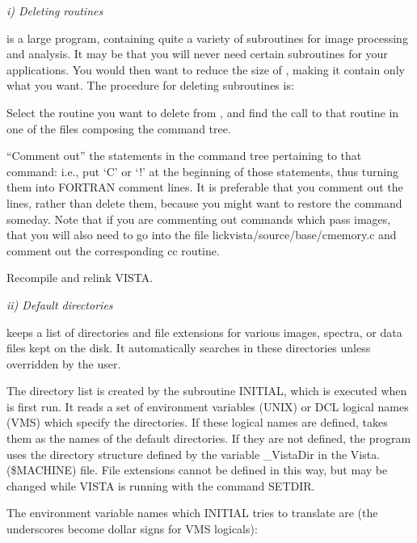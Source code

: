 \Sskip
\centerline {\it i) Deleting routines\rm}

	\V is a large program, containing quite a variety of
subroutines for image processing and analysis.  It may be that
you will never need certain subroutines for your applications.
You would then want to reduce the size of \Vns, making it contain
only what you want.  The procedure for deleting subroutines is:

\hang
{}Select the routine you want to delete
from \Vns, and find the call to that routine in one of the files
composing the command tree. 

\hang
{}``Comment out'' the statements in
the command tree pertaining to that command:  i.e., put `C' or
`!' at the beginning of those statements, thus turning them into
FORTRAN comment lines.  It is preferable that you comment out the
lines, rather than delete them, because you might want to restore
the command someday. Note that if you are commenting out commands which
pass images, that you will also need to go into the file 
lickvista/source/base/cmemory.c and comment out the corresponding cc
routine.

\hang
{}Recompile and relink VISTA.

\Sskip
\centerline {\it ii) Default directories\rm}

	\V keeps a list of directories and file extensions for various
images, spectra, or data files kept on the disk.  It automatically
searches in these directories unless overridden by the user. 

	The directory list is created by the subroutine INITIAL, which
is executed when \V is first run.  It reads a set of environment
variables (UNIX) or DCL logical names (VMS)
which specify the directories.  If these logical names are defined, \V
takes them as the names of the default directories.  If they are not
defined, the program uses the directory structure defined by the
variable \_VistaDir in the Vista.(\$MACHINE) file.
File extensions cannot be defined in this way, but may be changed
while VISTA is running with the command SETDIR. 

	The environment variable names which INITIAL tries to translate are
(the underscores become dollar signs for VMS logicals):

\yskip
\centerline {\vbox{
}}

